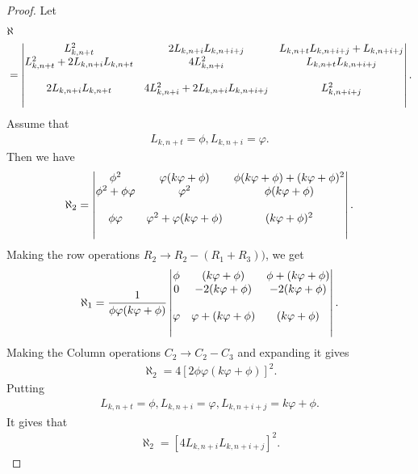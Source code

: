 \begin{proof}
Let
\begin{align*}
&\aleph\\& = \begin{vmatrix}
L_{k, n+t}^2 & 2L_{k, n+i}L_{k, n+i+j} & L_{k, n+t}L_{k, n+i+j}+ L_{k, n+i+j} \\
\bigskip
L_{k, n+t}^2+2 L_{k, n+i}L_{k, n+t}& 4 L_{k, n+i}^2 & L_{k, n+t}L_{k, n+i+j} \\
\bigskip
2 L_{k, n+i} L_{k, n+t}& 4 L_{k, n+i}^2+2 L_{k, n+i}L_{k, n+i+j} & L_{k, n+i+j}^2
\end{vmatrix}. 
\end{align*}
Assume that 
\begin{align*}
L_{k, n+t} = \phi,
L_{k, n+i} = \varphi.
\end{align*}
Then we have
\begin{align*}
\aleph_2 =\begin{vmatrix}
            \phi^2 & \varphi(k \varphi+\phi) &\phi(k \varphi+\phi)+(k \varphi+\phi)^2 \\
             \bigskip
            \phi^2+ \phi\varphi & \varphi^2 & \phi(k \varphi+\phi)\\
     \bigskip
            \phi\varphi & \varphi^2+\varphi(k \varphi+\phi) & (k \varphi+\phi)^2
                    \end{vmatrix}. 
\end{align*}
Making the row operations $R_2 \rightarrow  R_2 - (R_1+R_3))$, we get
\begin{align*}
\aleph_1 = \dfrac{1}{\phi \varphi (k \varphi+\phi)}  \begin{vmatrix}
            \phi &(k \varphi+\phi) & \phi+(k \varphi+\phi) \\
             \bigskip
            0 & -2(k \varphi+\phi) & -2(k \varphi+\phi)\\
     \bigskip
            \varphi& \varphi+(k \varphi+\phi) & (k \varphi+\phi) \end{vmatrix}.
\end{align*}
Making the Column operations 
$C_2 \rightarrow  C_2 - C_3$ and expanding it gives
\begin{align*}
\aleph_2 = 4 \left[ 2\phi\varphi(k \varphi+\phi)\right]^2.
\end{align*}
Putting
\begin{align*}
L_{k, n+t} = \phi,
L_{k, n+i} = \varphi,
L_{k, n+i+j} = k \varphi+\phi.
\end{align*}
It gives that
\begin{align*}
\aleph_2 = \left[ 4 L_{k, n+i}L_{k, n+i+j}\right]^2.
\end{align*}
\end{proof}
